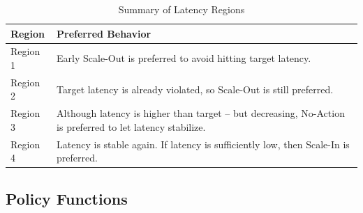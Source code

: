 \begin{table}[h]
    \begin{tabular}{ll}
        \toprule
        \textbf{Region} & \textbf{Preferred Behavior}\\
        \midrule
        Region 1 & Early Scale-Out is preferred to avoid hitting target latency.\\
        Region 2 & Target latency is already violated, so Scale-Out is still preferred.\\
        Region 3 & Although latency is higher than target -- but decreasing, No-Action is preferred to let latency stabilize.\\
        Region 4 & Latency is stable again. If latency is sufficiently low, then Scale-In is preferred.\\
        \bottomrule
    \end{tabular}
    \centering
    \caption{Summary of Latency Regions}
    \label{des:tab:rules}
\end{table}

\subsection{Policy Functions}
\label{des:pol}

